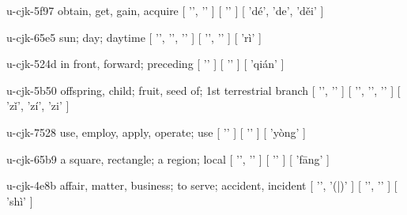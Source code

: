 \begin{multicols}{2}
\cjkgGlue{} u-cjk-5f97  obtain, get, gain, acquire  [ '\cjkgGlue{}', '\cjkgGlue{}' ]  [ '\cjkgGlue{}' ]  [ 'dé', 'de', 'd{\mktsRsgFb{}ě}i' ] 

\cjkgGlue{} u-cjk-65e5  sun; day; daytime  [ '\cjkgGlue{}', '\cjkgGlue{}', '\cjkgGlue{}' ]  [ '\cjkgGlue{}', '\cjkgGlue{}' ]  [ 'rì' ] 

\cjkgGlue{} u-cjk-524d  in front, forward; preceding  [ '\cjkgGlue{}' ]  [ '\cjkgGlue{}' ]  [ 'qián' ] 

\cjkgGlue{} u-cjk-5b50  offspring, child; fruit, seed of; 1st terrestrial branch  [ '\cjkgGlue{}', '\cjkgGlue{}' ]  [ '\cjkgGlue{}', '\cjkgGlue{}', '\cjkgGlue{}' ]  [ 'z{\mktsRsgFb{}ǐ}', 'zí', 'zi' ] 

\cjkgGlue{} u-cjk-7528  use, employ, apply, operate; use  [ '\cjkgGlue{}' ]  [ '\cjkgGlue{}' ]  [ 'yòng' ] 

\cjkgGlue{} u-cjk-65b9  a square, rectangle; a region; local  [ '\cjkgGlue{}', '\cjkgGlue{}' ]  [ '\cjkgGlue{}' ]  [ 'f{\mktsRsgFb{}ā}ng' ] 

\cjkgGlue{} u-cjk-4e8b  affair, matter, business; to serve; accident, incident  [ '\cjkgGlue{}', '\cjkgGlue{}(\cjkgGlue{}|\cjkgGlue{})' ]  [ '\cjkgGlue{}', '\cjkgGlue{}' ]  [ 'shì' ] 


\end{multicols}
